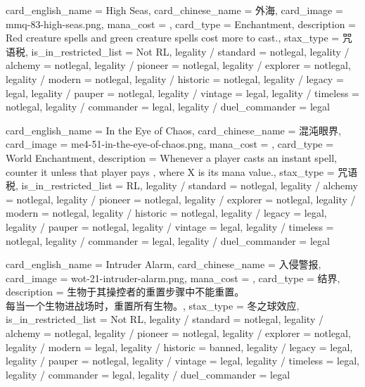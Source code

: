 \documentclass[lang = cn, color = black, 10pt]{AllThatStax}
\begin{document}
\card
{
	card_english_name = {High Seas},
	card_chinese_name = {外海},
	card_image = mmq-83-high-seas.png,
	mana_cost = ,
	card_type = Enchantment,
	description = {Red creature spells and green creature spells cost  more to cast.},
	stax_type = 咒语税,
	is_in_restricted_list = Not RL,
	legality / standard = notlegal,
	legality / alchemy = notlegal,
	legality / pioneer = notlegal,
	legality / explorer = notlegal,
	legality / modern = notlegal,
	legality / historic = notlegal,
	legality / legacy = legal,
	legality / pauper = notlegal,
	legality / vintage = legal,
	legality / timeless = notlegal,
	legality / commander = legal,
	legality / duel_commander = legal
}

\card
{
	card_english_name = {In the Eye of Chaos},
	card_chinese_name = {混沌眼界},
	card_image = me4-51-in-the-eye-of-chaos.png,
	mana_cost = ,
	card_type = World Enchantment,
	description = {Whenever a player casts an instant spell, counter it unless that player pays , where X is its mana value.},
	stax_type = 咒语税,
	is_in_restricted_list = RL,
	legality / standard = notlegal,
	legality / alchemy = notlegal,
	legality / pioneer = notlegal,
	legality / explorer = notlegal,
	legality / modern = notlegal,
	legality / historic = notlegal,
	legality / legacy = legal,
	legality / pauper = notlegal,
	legality / vintage = legal,
	legality / timeless = notlegal,
	legality / commander = legal,
	legality / duel_commander = legal
}

\card
{
	card_english_name = {Intruder Alarm},
	card_chinese_name = {入侵警报},
	card_image = wot-21-intruder-alarm.png,
	mana_cost = ,
	card_type = 结界,
	description = {生物于其操控者的重置步骤中不能重置。\\
		每当一个生物进战场时，重置所有生物。},
	stax_type = 冬之球效应,
	is_in_restricted_list = Not RL,
	legality / standard = notlegal,
	legality / alchemy = notlegal,
	legality / pioneer = notlegal,
	legality / explorer = notlegal,
	legality / modern = legal,
	legality / historic = banned,
	legality / legacy = legal,
	legality / pauper = notlegal,
	legality / vintage = legal,
	legality / timeless = legal,
	legality / commander = legal,
	legality / duel_commander = legal
}
\end{document}
